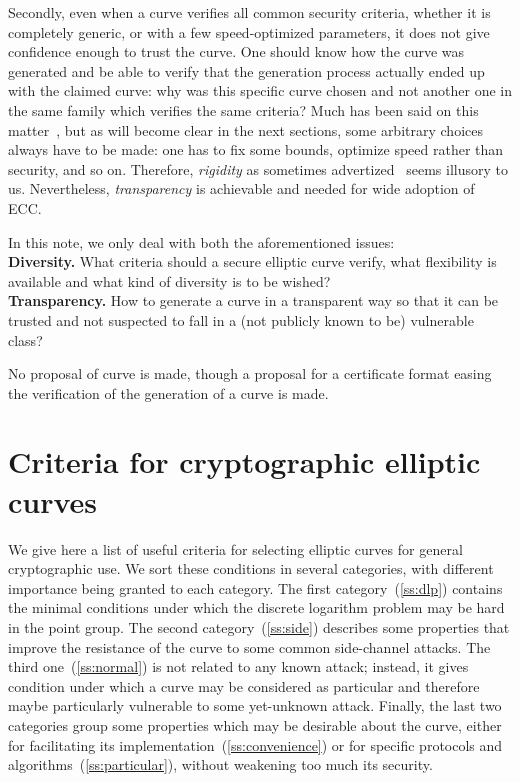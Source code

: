 \documentclass[twocolumn,letterpaper,10pt]{article}
\begin{document}
\medskip
Secondly, even when a curve verifies all common security criteria,
whether it is completely generic, or with a few speed-optimized parameters,
it does not give confidence enough to trust the curve.
One should know how the curve was generated and be able to verify that the
generation process actually ended up with the claimed curve:
why was this specific curve chosen and not another one in the same family
which verifies the same criteria?
Much has been said on this matter~\cite{safecurves,msr2014bcln,eprint2014brainpool,eprint2013abgr},
but as will become clear in the next sections, some arbitrary choices always have
to be made: one has to fix some bounds, optimize speed rather than security, and so on.
Therefore, \emph{rigidity} as sometimes advertized~\cite{safecurves} seems illusory
to us.
Nevertheless, \emph{transparency} is achievable and needed for wide adoption of ECC.

In this note, we only deal with both the aforementioned issues:\\
{\bf Diversity. }
What criteria should a secure elliptic curve verify, what flexibility is available and what kind of diversity is to be wished?\\
{\bf Transparency. }
How to generate a curve in a transparent way so that it can be trusted and
not suspected to fall in a (not publicly known to be) vulnerable class?

No proposal of curve is made, though a proposal for a certificate format
easing the verification of the generation of a curve is made.

\section{Criteria for cryptographic elliptic curves}
\label{s:criteria}

We give here a list of useful criteria for selecting elliptic curves
for general cryptographic use.
We sort these conditions in several categories,
with different importance being granted to each category.
The first category~(\ref{ss:dlp}) contains the minimal conditions under which
the discrete logarithm problem may be hard in the point group.
The second category~(\ref{ss:side}) describes some properties that improve
the resistance of the curve to some common side-channel attacks.
The third one~(\ref{ss:normal}) is not related to any known attack;
instead, it gives condition under which a curve may be considered
as particular and therefore maybe particularly vulnerable
to some yet-unknown attack.
Finally, the last two categories group some properties
which may be desirable about the curve,
either for facilitating its implementation~(\ref{ss:convenience})
or for specific protocols and algorithms~(\ref{ss:particular}),
without weakening too much its security.
\end{document}
